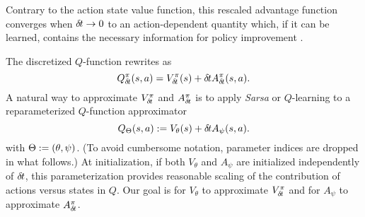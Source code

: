 Contrary to the action state value function,
this
rescaled advantage function converges when ${\delta\hspace{-.1em}t}\to 0$
to an action-dependent quantity which, if it can be learned, contains the
necessary information for policy improvement .




The discretized $Q$-function rewrites as
\begin{equation}
	Q^\pi_{\delta\hspace{-.1em}t}(s, a) = V^\pi_{\delta\hspace{-.1em}t}(s) + {\delta\hspace{-.1em}t} A^\pi_{\delta\hspace{-.1em}t}(s, a).
	\label{eq:reparam_q_pi}
\end{equation}
A natural way to approximate $V^\pi_{\delta\hspace{-.1em}t}$ and $A^\pi_{\delta\hspace{-.1em}t}$ is to apply
\emph{Sarsa} or $Q$-learning to a reparameterized $Q$-function approximator
\begin{equation}
	Q_\Theta(s, a) \mathrel{\mathop{:}}= V_{\theta}(s) + {\delta\hspace{-.1em}t} A_{\psi}(s, a).
\end{equation}
with $\Theta \mathrel{\mathop{:}}= (\theta, \psi)$. (To avoid cumbersome notation, 
parameter indices are dropped in what follows.)  At initialization, if both $V_{\theta}$ and
$A_{\psi}$ are initialized independently of ${\delta\hspace{-.1em}t}$, this parameterization
provides reasonable scaling of the contribution of actions versus states
in $Q$.
Our goal is for $V_\theta$ to approximate $V^\pi_{\delta\hspace{-.1em}t}$ and for
$A_{\psi}$ to approximate $A^\pi_{\delta\hspace{-.1em}t}$.



